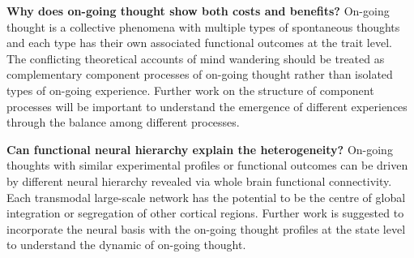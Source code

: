 
\textbf{Why does on-going thought show both costs and benefits?} On-going thought is a collective phenomena with multiple types of spontaneous thoughts and each type has their own associated functional outcomes at the trait level. The conflicting theoretical accounts of mind wandering should be treated as complementary component processes of on-going thought rather than isolated types of on-going experience. Further work on the structure of component processes will be important to understand the emergence of different experiences through the balance among different processes. 

\textbf{Can functional neural hierarchy explain the heterogeneity?} On-going thoughts with similar experimental profiles or functional outcomes can be driven by different neural hierarchy revealed via whole brain functional connectivity. Each transmodal large-scale network has the potential to be the centre of global integration or segregation of other cortical regions. Further work is suggested to incorporate the neural basis with the on-going thought profiles at the state level to understand the dynamic of on-going thought. 

